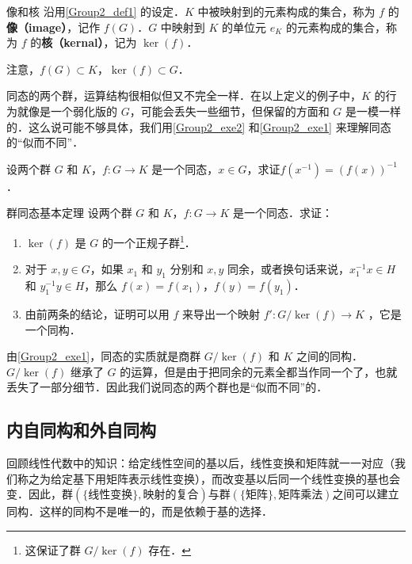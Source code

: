 \begin{definition}{像和核}
沿用\autoref{Group2_def1} 的设定．$K$ 中被映射到的元素构成的集合，称为 $f$ 的\textbf{像（image）}，记作 $f(G)$．$G$ 中映射到 $K$ 的单位元 $e_K$ 的元素构成的集合，称为 $f$ 的\textbf{核（kernal）}，记为 $\ker(f)$．
\end{definition}

注意，$f(G)\subset K$，$\ker(f)\subset G$．

同态的两个群，运算结构很相似但又不完全一样．在以上定义的例子中，$K$ 的行为就像是一个弱化版的 $G$，可能会丢失一些细节，但保留的方面和 $G$ 是一模一样的．这么说可能不够具体，我们用\autoref{Group2_exe2} 和\autoref{Group2_exe1} 来理解同态的“似而不同”．


\begin{exercise}{}\label{Group2_exe2}
设两个群 $G$ 和 $K$，$f:G\rightarrow K$ 是一个同态，$x\in G$，求证$f(x^{-1})=(f(x))^{-1}$．
\end{exercise}


\begin{exercise}{群同态基本定理}\label{Group2_exe1}
设两个群 $G$ 和 $K$，$f:G\rightarrow K$ 是一个同态．求证：
\begin{enumerate}
\item $\ker(f)$ 是 $G$ 的一个正规子群\footnote{这保证了群 $G/\ker(f)$ 存在．}．
\item 对于 $x, y\in G$，如果 $x_1$ 和 $y_1$ 分别和 $x, y$ 同余，或者换句话来说，$x_1^{-1}x\in H$ 和 $y_1^{-1}y\in H$，那么 $f(x)=f(x_1)$，$f(y)=f(y_1)$．
\item 由前两条的结论，证明可以用 $f$ 来导出一个映射 $f': G/\ker(f)\rightarrow K$ ，它是一个同构．

\end{enumerate}
\end{exercise}

由\autoref{Group2_exe1}，同态的实质就是商群 $G/\ker(f)$ 和 $K$ 之间的同构．$G/\ker(f)$ 继承了 $G$ 的运算，但是由于把同余的元素全都当作同一个了，也就丢失了一部分细节．因此我们说同态的两个群也是“似而不同”的．



\subsection{内自同构和外自同构}

回顾线性代数中的知识：给定线性空间的基以后，线性变换和矩阵就一一对应（我们称之为给定基下用矩阵表示线性变换），而改变基以后同一个线性变换的基也会变．因此，群$(\{\text{线性变换}\}, \text{映射的复合})$与群$(\{\text{矩阵}\}, \text{矩阵乘法})$之间可以建立同构．这样的同构不是唯一的，而是依赖于基的选择．

